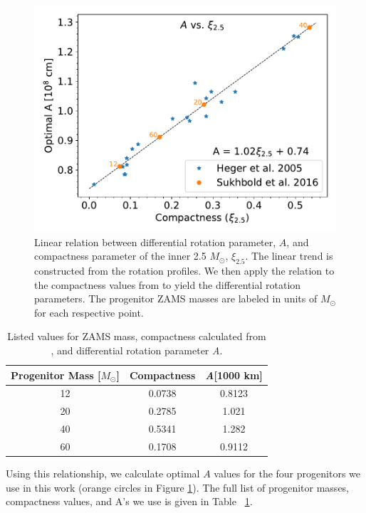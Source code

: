 \documentclass[twocolumn,times]{aastex62}  %
\begin{document}
\begin{figure}[t]
    \centering
    \includegraphics[scale=0.45]{figures/a_vs_compact.pdf}
    \caption{Linear relation between differential rotation parameter, $A$, and compactness parameter of the inner 2.5 $M_\odot$, $\xi_{2.5}$.  The linear trend is constructed from the \citet{heger:2005} rotation profiles.  We then apply the relation to the compactness values from \citet{Suk:2016} to yield the differential rotation parameters.  The progenitor ZAMS masses are labeled in units of $M_\odot$ for each respective point.}
    \label{fig:a_vs_comp}
\end{figure}

\begin{table}[h]
\begin{tabular}{c|c|c}
Progenitor Mass [$M_\odot$] & Compactness & \textit{A}[1000 km] \\
\hline
12  & 0.0738 &         0.8123             \\
20  & 0.2785 &         1.021            \\
40  & 0.5341 &         1.282           \\
60  & 0.1708 &         0.9112          
\end{tabular}
\caption{Listed values for ZAMS mass, compactness calculated from \citet{Suk:2016}, and differential rotation parameter \textit{A}.}
\label{table:compact}
\end{table}

Using this relationship, we calculate optimal $A$ values for the four \citet{Suk:2016} progenitors we use in this work (orange circles in Figure \ref{fig:a_vs_comp}).  
The full list of progenitor masses, compactness values, and A's we use is given in Table ~\ref{table:compact}.  
\end{document}

